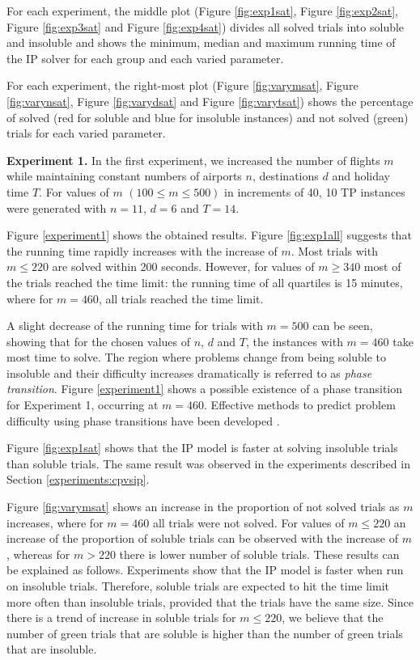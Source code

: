 \documentclass{mpaper}
\begin{document}
For each experiment, the middle plot (Figure \ref{fig:exp1sat}, Figure \ref{fig:exp2sat}, Figure \ref{fig:exp3sat} and Figure \ref{fig:exp4sat}) divides all solved trials into soluble and insoluble and shows the minimum, median and maximum running time of the IP solver for each group and each varied parameter.

For each experiment, the right-most plot (Figure \ref{fig:varymsat}, Figure \ref{fig:varynsat}, Figure \ref{fig:varydsat} and Figure \ref{fig:varytsat}) shows the percentage of solved (red for soluble and blue for insoluble instances) and not solved (green) trials for each varied parameter.

\textbf{Experiment 1.} In the first experiment, we increased the number of flights $m$ while maintaining constant numbers of airports $n$, destinations $d$ and holiday time $T$. For values of $m$ $(100 \leq m \leq 500)$ in increments of 40, 10 TP instances were generated with $n=11$, $d=6$ and $T=14$.

Figure \ref{experiment1} shows the obtained results.
Figure \ref{fig:exp1all} suggests that the running time rapidly increases with the increase of $m$. Most trials with $m \leq 220$ are solved within 200 seconds. However, for values of $m \geq 340$ most of the trials reached the time limit: the running time of all quartiles is 15 minutes, where for $m=460$, all trials reached the time limit.

A slight decrease of the running time for trials with $m=500$ can be seen, showing that for the chosen values of $n$, $d$ and $T$, the instances with $m=460$ take most time to solve. The region where problems change from being soluble to insoluble and their difficulty increases dramatically is referred to as \textit{phase transition}. Figure \ref{experiment1} shows a possible existence of a phase transition for Experiment 1, occurring at $m=460$. Effective methods to predict problem difficulty using phase transitions have been developed \cite{Prosser1996,Cheeseman:1991}.

Figure \ref{fig:exp1sat} shows that the IP model is faster at solving insoluble trials than soluble trials. The same result was observed in the experiments described in Section \ref{experiments:cpvsip}.

Figure \ref{fig:varymsat} shows an increase in the proportion of not solved trials as $m$ increases, where for $m=460$ all trials were not solved. For values of $m \leq 220$ an increase of the proportion of soluble trials can be observed with the increase of $m$, whereas for $m > 220$ there is lower number of soluble trials. These results can be explained as follows. Experiments show that the IP model is faster when run on insoluble trials. Therefore, soluble trials are expected to hit the time limit more often than insoluble trials, provided that the trials have the same size. Since there is a trend of increase in soluble trials for $m \leq 220$, we believe that the number of green trials that are soluble is higher than the number of green trials that are insoluble.
\end{document}
